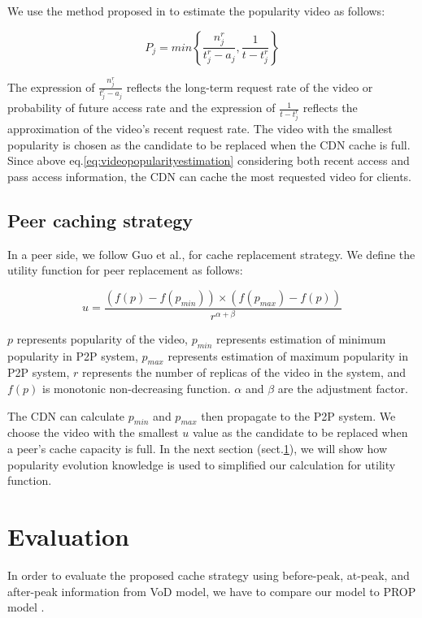 \documentclass[conference]{IEEEtran}
\begin{document}
We use the method proposed in \cite{1613869} to estimate the popularity video as follows:

\begin{equation}
P_j = min\left\{\frac{n_j^r}{t_j^r - a_j}, \frac{1}{t - t_j^r}\right\}
\label{eq:videopopularityestimation}
\end{equation}

The expression of $\frac{n_j^r}{t_j^r - a_j}$ reflects the long-term request rate of the video or probability of future access rate and the expression of $\frac{1}{t - t_j^r}$ reflects the approximation of the video's recent request rate.
The video with the smallest popularity is chosen as the candidate to be replaced when the CDN cache is full. 
Since above eq.\ref{eq:videopopularityestimation} considering both recent access and pass access information, the CDN can cache the most requested video for clients.

\subsection{Peer caching strategy}\label{peercachingstrategy}
In a peer side, we follow Guo et al., \cite{1613869} for cache replacement strategy. 
We define the utility function for peer replacement as follows:

\begin{equation}
u = \frac{ (f(p)-f(p_{min})) \times  (f(p_{max})-f(p))}{r^{\alpha + \beta}}
\label{eq:utilityfunction}
\end{equation}

$p$ represents popularity of the video, $p_{min}$ represents estimation of minimum popularity in P2P system, $p_{max}$ represents estimation of maximum popularity in P2P system, $r$ represents the number of replicas of the video in the system, and $f(p)$ is monotonic non-decreasing function.
$\alpha$ and $\beta$ are the adjustment factor.

The CDN can calculate $p_{min}$ and $p_{max}$ then propagate to the P2P system.
We choose the video with the smallest $u$ value as the candidate to be replaced when a peer's cache capacity is full.
In the next section (sect.\ref{evaluation}), we will show how popularity evolution knowledge is used to simplified our calculation for utility function.



\section{Evaluation}\label{evaluation}
In order to evaluate the proposed cache strategy using before-peak, at-peak, and after-peak information from VoD model, we have to compare our model to PROP model \cite{1613869}.
\end{document}
